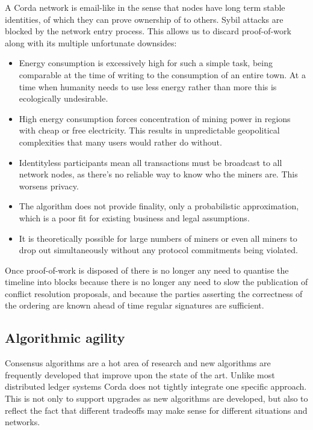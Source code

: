 \documentclass{article}
\begin{document}
A Corda network is email-like in the sense that nodes have long term stable identities, of which they can prove ownership
of to others. Sybil attacks are blocked by the network entry process. This allows us to discard proof-of-work along with
its multiple unfortunate downsides:

\begin{itemize}
\item Energy consumption is excessively high for such a simple task, being comparable at the time of writing to the
consumption of an entire town. At a time when humanity needs to use less energy rather than more this is ecologically
undesirable.
\item High energy consumption forces concentration of mining power in regions with cheap or free electricity. This results
in unpredictable geopolitical complexities that many users would rather do without.
\item Identityless participants mean all transactions must be broadcast to all network nodes, as there's no reliable
way to know who the miners are. This worsens privacy.
\item The algorithm does not provide finality, only a probabilistic approximation, which is a poor fit for existing
business and legal assumptions.
\item It is theoretically possible for large numbers of miners or even all miners to drop out simultaneously without
any protocol commitments being violated.
\end{itemize}

Once proof-of-work is disposed of there is no longer any need to quantise the timeline into blocks because there is
no longer any need to slow the publication of conflict resolution proposals, and because the parties asserting the
correctness of the ordering are known ahead of time regular signatures are sufficient.

\subsection{Algorithmic agility}

Consensus algorithms are a hot area of research and new algorithms are frequently developed that improve upon the state
of the art. Unlike most distributed ledger systems Corda does not tightly integrate one specific approach. This is not
only to support upgrades as new algorithms are developed, but also to reflect the fact that different tradeoffs may make
sense for different situations and networks.
\end{document}
